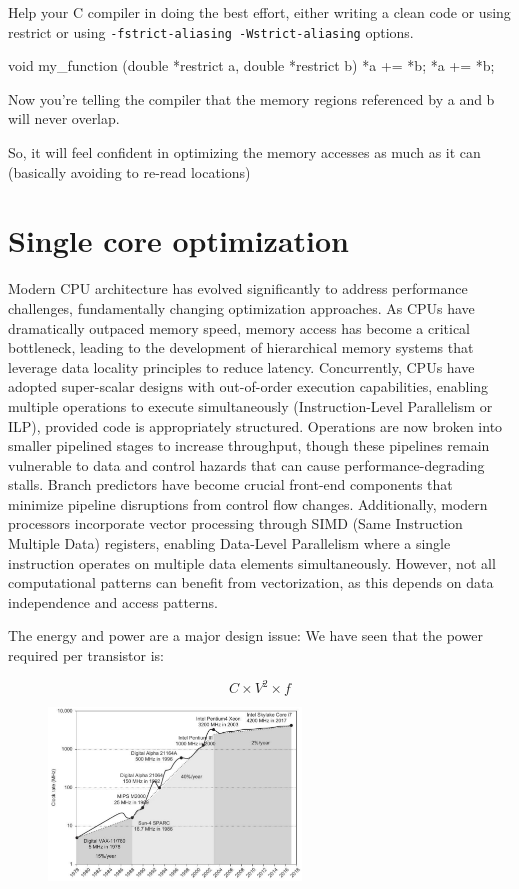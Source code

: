 Help your C compiler in doing the best effort, either writing a clean code or using restrict or using \texttt{-fstrict-aliasing -Wstrict-aliasing} options.

\begin{codeblock}[language = C]
void my_function (double *restrict a, double *restrict b)  {
    *a += *b;
    *a += *b;
}
\end{codeblock}

Now you’re telling the compiler that the memory regions referenced by a and b will never overlap.

So, it will feel confident in optimizing the memory accesses as much as it can (basically avoiding to re-read locations)

\section{Single core optimization}

Modern CPU architecture has evolved significantly to address performance challenges, fundamentally changing optimization approaches. As CPUs have dramatically outpaced memory speed, memory access has become a critical bottleneck, leading to the development of hierarchical memory systems that leverage data locality principles to reduce latency. Concurrently, CPUs have adopted super-scalar designs with out-of-order execution capabilities, enabling multiple operations to execute simultaneously (Instruction-Level Parallelism or ILP), provided code is appropriately structured. Operations are now broken into smaller pipelined stages to increase throughput, though these pipelines remain vulnerable to data and control hazards that can cause performance-degrading stalls. Branch predictors have become crucial front-end components that minimize pipeline disruptions from control flow changes. Additionally, modern processors incorporate vector processing through SIMD (Same Instruction Multiple Data) registers, enabling Data-Level Parallelism where a single instruction operates on multiple data elements simultaneously. However, not all computational patterns can benefit from vectorization, as this depends on data independence and access patterns.

The energy and power are a major design issue: We have seen that the power required per transistor is:

$$
C\times V^2 \times f
$$

\begin{figure}[H]
    \centering
    \includegraphics[width = 0.6\textwidth]{assets/power_issue.png}
\end{figure}


